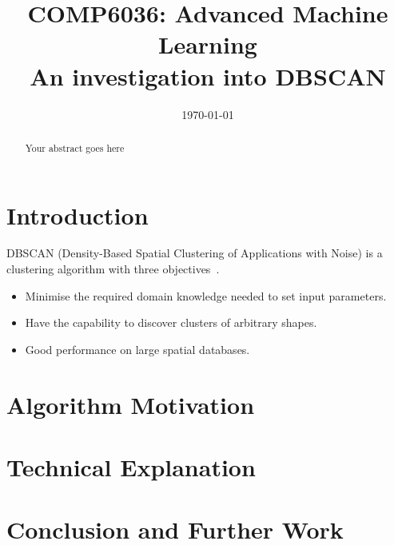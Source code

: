 \documentclass{ecsarticle}     %
\begin{document}
\frontmatter
\title      {COMP6036: Advanced Machine Learning\\[1cm]
            An investigation into DBSCAN}
      
\addresses  {\deptname\\\univname}

\date       {\today}
\subject    {}
\keywords   {}
\maketitle



\begin{abstract}
Your abstract goes here
\end{abstract}

\mainmatter


\section{Introduction}

DBSCAN (Density-Based Spatial Clustering of Applications with Noise) is a clustering algorithm with three objectives~\citep{Ester96adensity-based}.

\begin{itemize}
   \item Minimise the required domain knowledge needed to set input parameters. 
   \item Have the capability to discover clusters of arbitrary shapes.
   \item Good performance on large spatial databases.
\end{itemize}


\section{Algorithm Motivation}
\section{Technical Explanation}
\section{Conclusion and Further Work}



\end{document}
